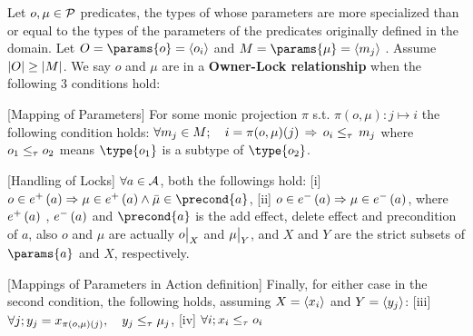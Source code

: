 \begin{defi}

Let $o, \mu \in {\cal P}$ predicates, the types of whose parameters are
more specialized than or equal to the types of the parameters of the predicates
originally defined in the domain.
Let $O = \params{o} = \left< o_i  \right>$ and 
$M = \params{\mu} = \left< m_j \right>$ .
Assume $\left|O\right| \geq \left|M\right|$.
We say $o$ and $\mu$ are in a \textbf{Owner-Lock relationship}
 when the following 3 conditions hold:

[Mapping of Parameters] For some monic projection $\pi$ s.t.
$\pi(o,\mu ) : j \mapsto i$ the following condition holds:
$\forall m_j \in M ; \quad  i=\pi(o,\mu)(j) \, \Rightarrow \, o_i \leq_\tau\,m_j $
where $o_1\leq_\tau o_2$ means $\type{o_1}$ is a subtype of $\type{o_2}$.

[Handling of Locks] $\forall a \in {\cal A}$, both the followings hold:
[i]  $o \in \adde{a} \Rightarrow \mu \in \adde{a}  \land \bar{\mu} \in \precond{a}$, 
[ii] $ o\in e^-\left(a\right) \Rightarrow \mu \in e^-\left(a\right)$, 
where $e^+\left(a\right)$ , $e^-\left(a\right)$ and $\precond{a}$ is the add effect,
delete effect and precondition of $a$, 
 also $o$ and $\mu$ are actually $o\big|_{X}$ and $\mu\big|_{Y}$,
 and $X$ and $Y$ are the strict subsets of $\params{a}$ and $X$, respectively.

[Mappings of Parameters in Action definition] Finally, for either case in the second condition,
the following holds, assuming $X=\left<x_i\right>$ and $Y=\left<y_j\right>$:
[iii]  $\forall j; y_j = x_{\pi(o,\mu)(j)} ,\quad y_j \leq_\tau \mu_j$, 
[iv]  $\forall i; x_i \leq_\tau o_i$

\end{defi}


